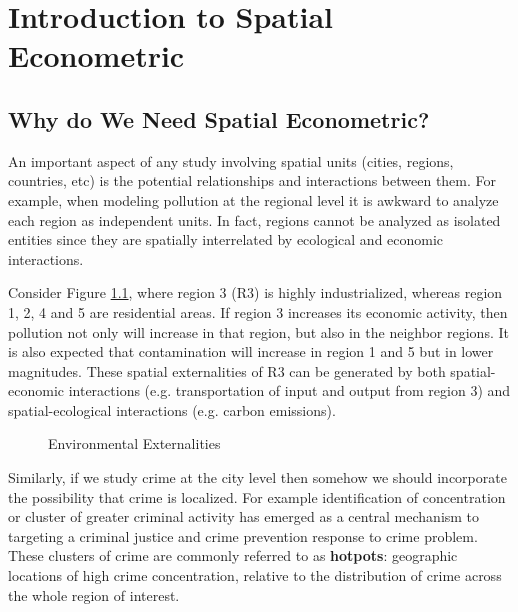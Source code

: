 \chapter{Introduction to Spatial Econometric}\label{chapater:Introduction}


\section{Why do We Need Spatial Econometric?}\label{sec:why_se}

An important aspect of any study involving spatial units (cities, regions, countries, etc) is the potential relationships and interactions between them. For example, when modeling pollution at the regional level it is awkward to analyze each region as independent units.  In fact, regions cannot be analyzed as isolated entities since they are spatially interrelated by ecological and economic interactions. 

Consider Figure \ref{fig:example_poll}, where region 3 (R3) is highly industrialized, whereas region 1, 2, 4 and 5 are residential areas. If region 3 increases its economic activity, then pollution not only will increase in that region, but also in the neighbor regions. It is also expected that contamination will increase in region 1 and 5 but in lower magnitudes. These spatial externalities of R3 can be generated by both spatial-economic interactions (e.g. transportation of input and output from region 3) and spatial-ecological interactions (e.g. carbon emissions). 

\begin{figure}[h]
\caption{Environmental Externalities}
\label{fig:example_poll}
\centering
{}
\end{figure}

Similarly, if we study crime at the city level then somehow we should incorporate the possibility that crime is localized. For example identification of concentration or cluster of greater criminal activity has emerged as a central mechanism to targeting a criminal justice and crime prevention response to crime problem. These clusters of crime are commonly referred to as \textbf{hotpots}: geographic locations of high crime concentration, relative to the distribution of crime across the whole region of interest. 

